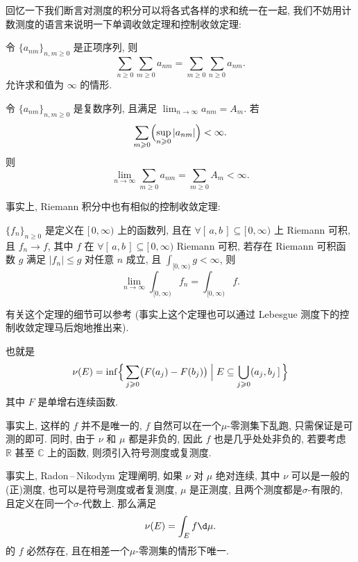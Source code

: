 \begin{alterendnote}
    回忆一下我们断言对测度的积分可以将各式各样的求和统一在一起, 我们不妨用计数测度的语言来说明一下单调收敛定理和控制收敛定理:
    \begin{theorem}[单调收敛定理]
        令 $\{a_{nm}\}_{n,m\geqslant 0}$ 是正项序列, 则
        \[
            \sum_{n\geqslant 0}\sum_{m\geqslant 0}a_{nm} = \sum_{m\geqslant 0}\sum_{n\geqslant 0}a_{nm}
            .\]
        允许求和值为 $\infty$ 的情形.
    \end{theorem}
    \begin{theorem}[控制收敛定理]
        令 $\{a_{nm}\}_{n,m\geqslant 0}$ 是复数序列, 且满足 $\lim_{n \to \infty} a_{nm} = A_m$. 若
        \[
            \sum_{m\geqslant 0}\Bigl(\sup_{n\geqslant 0} |a_{nm}|\Bigr) <\infty
            .\]
        则
        \[
            \lim_{n \to \infty}\sum_{m\geqslant 0}a_{nm} = \sum_{m\geqslant 0}A_m < \infty
            .\]
    \end{theorem}
\end{alterendnote}
\begin{alterendnote}
    事实上, Riemann 积分中也有相似的控制收敛定理:
    \begin{theorem}
        $\{f_n\}_{n\geqslant 0}$ 是定义在 $[\,0,\infty)$ 上的函数列, 且在 $\forall[\,a,b\,]\subseteq[\,0,\infty)$ 上 Riemann 可积, 且 $f_n\to f$, 其中 $f$ 在 $\forall[\,a,b\,]\subseteq[\,0,\infty)$ Riemann 可积, 若存在 Riemann 可积函数 $g$ 满足 $|f_n|\leqslant g$ 对任意 $n$ 成立, 且 $\int_{[0,\infty)}g<\infty$, 则  \[\lim_{n \to \infty} \int_{[0,\infty)} f_n = \int_{[0,\infty)} f.\]
    \end{theorem}
    \noindent 有关这个定理的细节可以参考\cite{Cunningham67} (事实上这个定理也可以通过 Lebesgue 测度下的控制收敛定理马后炮地推出来).
\end{alterendnote}
\begin{alterendnote}
    也就是\[\nu (E)=\inf\Bigl\{ \,\sum_{j\geqslant 0}\bigl(F(a_j)-F(b_j)\bigr)\Bigm| E\subseteq\bigcup_{j\geqslant 0}(a_j,b_j\,]\, \Bigr\}\]其中 $F$ 是单增右连续函数.
\end{alterendnote}
\begin{alterendnote}
    事实上, 这样的 $f$ 并不是唯一的, $f$ 自然可以在一个\;$\mu $-零测集下乱跑, 只需保证是可测的即可. 同时, 由于 $\nu $ 和 $\mu $ 都是非负的, 因此 $f$ 也是几乎处处非负的, 若要考虑 $\mathbb R$ 甚至 $\mathbb C$ 上的函数, 则须引入符号测度或复测度.
\end{alterendnote}
\begin{alterendnote}
    事实上, Radon\,--\,Nikodym 定理阐明, 如果 $\nu$ 对 $\mu $ 绝对连续, 其中 $\nu$ 可以是一般的(正)测度, 也可以是符号测度或者复测度, $\mu $ 是正测度, 且两个测度都是\;$\sigma $-有限的, 且定义在同一个\;$\sigma $-代数上. 那么满足
    \[
        \nu (E) = \int_E f\d \mu
        .\]
    的 $f$ 必然存在, 且在相差一个\;$\mu $-零测集的情形下唯一.
\end{alterendnote}
